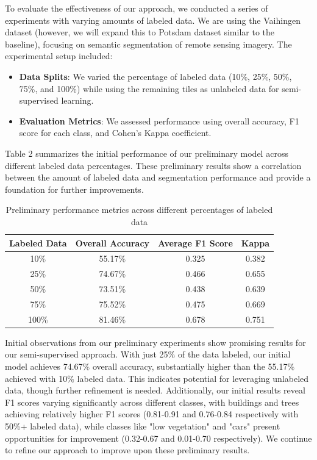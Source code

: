 \documentclass[conference]{IEEEtran}
\begin{document}
To evaluate the effectiveness of our approach, we conducted a series of experiments with varying amounts of labeled data. We are using the Vaihingen dataset (however, we will expand this to Potsdam dataset similar to the baseline), focusing on semantic segmentation of remote sensing imagery. The experimental setup included:

\begin{itemize}
    \item \textbf{Data Splits}: We varied the percentage of labeled data (10\%, 25\%, 50\%, 75\%, and 100\%) while using the remaining tiles as unlabeled data for semi-supervised learning.
    \item \textbf{Evaluation Metrics}: We assessed performance using overall accuracy, F1 score for each class, and Cohen's Kappa coefficient.
\end{itemize}

Table 2 summarizes the initial performance of our preliminary model across different labeled data percentages. These preliminary results show a correlation between the amount of labeled data and segmentation performance and provide a foundation for further improvements.

\begin{table}[h]
\centering
\begin{tabular}{|c|c|c|c|}
\hline
\textbf{Labeled Data} & \textbf{Overall Accuracy} & \textbf{Average F1 Score} & \textbf{Kappa} \\
\hline
10\% & 55.17\% & 0.325 & 0.382 \\
25\% & 74.67\% & 0.466 & 0.655 \\
50\% & 73.51\% & 0.438 & 0.639 \\
75\% & 75.52\% & 0.475 & 0.669 \\
100\% & 81.46\% & 0.678 & 0.751 \\
\hline
\end{tabular}
\caption{Preliminary performance metrics across different percentages of labeled data}
\end{table}
Initial observations from our preliminary experiments show promising results for our semi-supervised approach. With just 25\% of the data labeled, our initial model achieves 74.67\% overall accuracy, substantially higher than the 55.17\% achieved with 10\% labeled data. This indicates potential for leveraging unlabeled data, though further refinement is needed. Additionally, our initial results reveal F1 scores varying significantly across different classes, with buildings and trees achieving relatively higher F1 scores (0.81-0.91 and 0.76-0.84 respectively with 50\%+ labeled data), while classes like "low vegetation" and "cars" present opportunities for improvement (0.32-0.67 and 0.01-0.70 respectively). We continue to refine our approach to improve upon these preliminary results.
\end{document}
